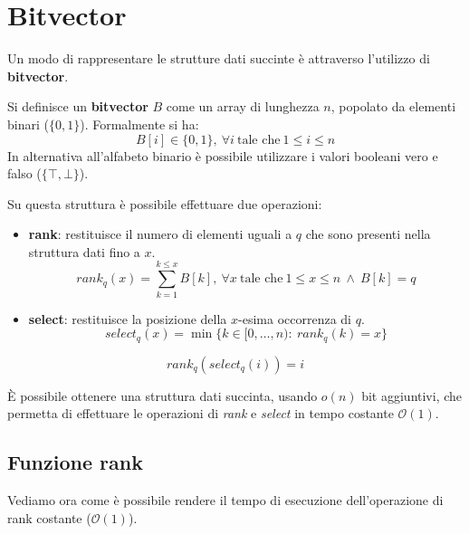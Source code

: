 \section{Bitvector}
Un modo di rappresentare le strutture dati succinte è attraverso l'utilizzo di
\textbf{bitvector}.
\begin{definizione}
    Si definisce un \textbf{bitvector} $B$ come un array di lunghezza $n$, popolato
    da elementi binari ($\{0, 1\}$). Formalmente si ha:
    \begin{equation}
        B[i] \in \{0, 1\}, \ \forall i \ \text{tale che} \ 1 \leq i \leq n
    \end{equation}
    In alternativa all'alfabeto binario è possibile utilizzare i valori booleani
    vero e falso ($\{\top, \bot\}$).
\end{definizione}
Su questa struttura è possibile effettuare due operazioni:
\begin{itemize}
    \item \textbf{rank}: restituisce il numero di elementi uguali a $q$ che sono
          presenti nella struttura dati fino a $x$.
          \begin{equation}
              rank_q(x) = \sum_{k = 1}^{k \leq x} B[k], \ \forall x \
              \text{tale che} \ 1 \leq x \leq n \ \land \ B[k] = q
          \end{equation}
    \item \textbf{select}: restituisce la posizione della $x$-esima occorrenza
          di $q$.
          \begin{equation}
              select_q(x) = \min{\{k \in [0, \dots, n): \ rank_q(k) = x\}}
          \end{equation}
\end{itemize}
\begin{nota}
    \begin{equation}
        rank_q(select_q(i)) = i
    \end{equation}
\end{nota}
È possibile ottenere una struttura dati succinta, usando $o(n)$ bit aggiuntivi,
che permetta di effettuare le operazioni di \textit{rank} e \textit{select} in
tempo costante $\mathcal{O}(1)$.
\subsection{Funzione rank}
Vediamo ora come è possibile rendere il tempo di esecuzione dell'operazione di
rank costante ($\mathcal{O}(1)$).

